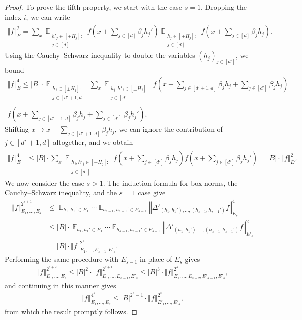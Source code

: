 \documentclass[11pt]{amsart}
\theoremstyle{definition}
\DeclareMathOperator*{\E}{\mathbb{E}}
\newcommand{\norm}[1]{\left\Vert #1\right\Vert}
\newcommand{\brac}[1]{\mathopen{}\left( #1 \mathclose{}\right)}
\begin{document}
\begin{proof}
    To prove the fifth property, we start with the case $s=1$. Dropping the index $i$,
    we can write
    \begin{align*}
        \norm{f}_E^2 = \sum_x \E_{\substack{h'_j\in[\pm H_j]:\\ {j\in [d]}}} f\brac{x+\sum_{j\in [d]}\beta_j h_j'}\E_{\substack{h_j\in[\pm H_j]:\\ {j\in [d]}}}\overline{f\brac{x+\sum_{j\in [d]}\beta_j h_j}}.
    \end{align*}
    Using the Cauchy--Schwarz inequality to double the variables $(h_j)_{j\in [d']}$, we bound
    \begin{multline*}
        \norm{f}_E^4 \leq |B|\cdot \E_{\substack{h_j\in[\pm H_j]:\\ {j\in [d'+1,d]}}} \sum_x \E_{\substack{h_j, h'_j\in[\pm H_j]:\\ {j\in [d']}}}
        f\brac{x+\sum_{j\in [d'+1,d]}\beta_j h_j + \sum_{j\in [d']}\beta_j h_j}\\ \overline{f\brac{x+\sum_{j\in [d'+1,d]}\beta_j h_j + \sum_{j\in [d']}\beta_j h_j'}}.
    \end{multline*}
    Shifting $x\mapsto x - \sum\limits_{j\in [d'+1,d]}\beta_j h_j$, we can ignore the contribution of $j \in [d'+1,d]$ altogether, and we obtain
    \begin{align*}
        \norm{f}_E^4 &\leq |B|\cdot \sum_x \E_{\substack{h_j, h'_j\in[\pm H_j]:\\ {j\in [d']}}}
        f\brac{x+ \sum_{j\in [d']}\beta_j h_j}\overline{f\brac{x+ \sum_{j\in [d']}\beta_j h_j'}} = |B|\cdot \norm{f}_{E'}^2.
    \end{align*}
    We now consider the case $s>1$.  The induction formula for box norms, the Cauchy--Schwarz inequality, and the $s=1$ case give 
    \begin{align*}
        \norm{f}_{E_1, \ldots, E_s}^{2^{s+1}} &\leq \E_{h_1,h_1'\in E_1}\cdots\E_{h_{s-1}, h_{s-1}'\in E_{s-1}}\norm{\Delta'_{(h_1, h_1'), \ldots, (h_{s-1}, h_{s-1}')}f}_{E_s}^4\\
        &\leq |B|\cdot \E_{h_1,h_1'\in E_1}\cdots\E_{h_{s-1}, h_{s-1}'\in E_{s-1}}\norm{\Delta'_{(h_1, h_1'), \ldots, (h_{s-1}, h_{s-1}')}f}_{E'_s}^2 \\
    &= |B| \cdot \norm{f}_{E_1, \ldots, E_{s-1}, E'_s}^{2^s}.    
    \end{align*}
    Performing the same procedure with $E_{s-1}$ in place of $E_s$ gives
    \begin{align*}
        \norm{f}_{E_1, \ldots, E_s}^{2^{s+2}}\leq |B|^2 \cdot \norm{f}_{E_1, \ldots, E_{s-1}, E'_s}^{2^{s+1}}\leq |B|^3 \cdot \norm{f}_{E_1, \ldots, E_{s-2}, E'_{s-1}, E'_s}^{2^{s}},
    \end{align*}
    and continuing in this manner gives
    \begin{align*}
        \norm{f}_{E_1, \ldots, E_s}^{4^{s}}\leq |B|^{2^s-1} \cdot \norm{f}_{E'_1, \ldots, E'_s}^{2^{s}},
    \end{align*}    
    from which the result promptly follows.
  


\end{proof}
\end{document}
